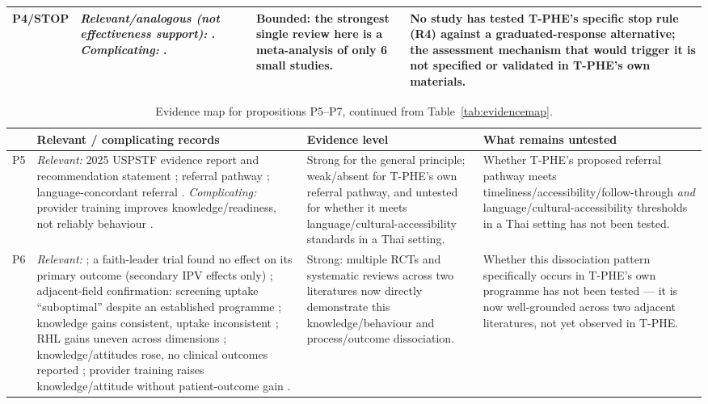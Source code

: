 \documentclass[11pt]{article}
\newcommand{\tphe}{T\mbox{-}PHE}
\begin{document}
\begin{table}[H]
\begin{tabularx}{\textwidth}{@{}p{0.9cm}YYY@{}}
\addlinespace
P4\slash STOP & \emph{Relevant/analogous (not effectiveness support):} \cite{ref45,ref46,ref47,ref48,ref9,ref10,ref43}. \emph{Complicating:} \cite{ref49,ref50}. & Bounded: the strongest single review here is a meta-analysis of only 6 small studies. & No study has tested \tphe{}'s specific stop rule (R4) against a graduated-response alternative; the assessment mechanism that would trigger it is not specified or validated in \tphe{}'s own materials.\\
\bottomrule
\end{tabularx}
\end{table}

\begin{table}[H]
\centering\footnotesize
\caption{Evidence map for propositions P5--P7, continued from Table~\ref{tab:evidencemap}.}
\label{tab:evidencemap2}
\begin{tabularx}{\textwidth}{@{}p{0.9cm}YYY@{}}
\toprule
& \textbf{Relevant / complicating records} & \textbf{Evidence level} & \textbf{What remains untested}\\
\midrule
P5 & \emph{Relevant:} 2025 USPSTF evidence report and recommendation statement \cite{ref38,ref39,ref40}; referral pathway \cite{ref42,ref43,ref44,ref104,ref105,ref106,ref107}; language-concordant referral \cite{ref60,ref62,ref63,ref61,ref64}. \emph{Complicating:} provider training improves knowledge/readiness, not reliably behaviour \cite{ref108,ref109,ref41}. & Strong for the general principle; weak/absent for \tphe{}'s own referral pathway, and untested for whether it meets language/cultural-accessibility standards in a Thai setting. & Whether \tphe{}'s proposed referral pathway meets timeliness/accessibility/follow-through \emph{and} language/cultural-accessibility thresholds in a Thai setting has not been tested.\\
\addlinespace
P6 & \emph{Relevant:} \cite{ref110,ref28,ref111,ref112}; a faith-leader trial found no effect on its primary outcome (secondary IPV effects only) \cite{ref29}; adjacent-field confirmation: screening uptake ``suboptimal'' despite an established programme \cite{ref12}; knowledge gains consistent, uptake inconsistent \cite{ref13}; RHL gains uneven across dimensions \cite{ref34}; knowledge/attitudes rose, no clinical outcomes reported \cite{ref35}; provider training raises knowledge/attitude without patient-outcome gain \cite{ref55,ref56,ref57}. & Strong: multiple RCTs and systematic reviews across two literatures now directly demonstrate this knowledge/behaviour and process/outcome dissociation. & Whether this dissociation pattern specifically occurs in \tphe{}'s own programme has not been tested --- it is now well-grounded across two adjacent literatures, not yet observed in \tphe{}.\\

\end{tabularx}
\end{table}
\end{document}
